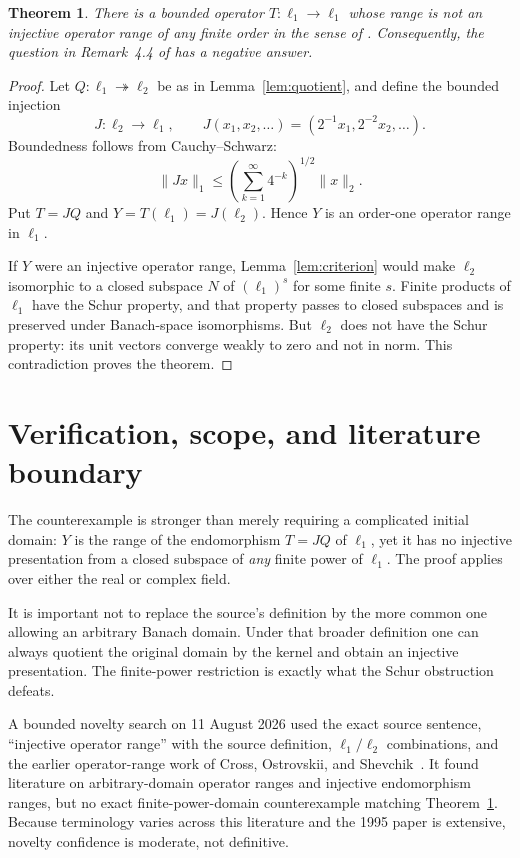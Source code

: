 \documentclass[11pt]{article}
\newtheorem{theorem}{Theorem}
\begin{document}
\begin{theorem}\label{thm:counterexample}
There is a bounded operator $T:\ell_1\to\ell_1$ whose range is not an
injective operator range of any finite order in the sense of \cite{RT}.
Consequently, the question in Remark~4.4 of \cite{RT} has a negative answer.
\end{theorem}

\begin{proof}
Let $Q:\ell_1\twoheadrightarrow\ell_2$ be as in
Lemma~\ref{lem:quotient}, and define the bounded injection
\[
 J:\ell_2\longrightarrow\ell_1,
 \qquad J(x_1,x_2,\ldots)=(2^{-1}x_1,2^{-2}x_2,\ldots).
\]
Boundedness follows from Cauchy--Schwarz:
\[
 \|Jx\|_1\leq
 \left(\sum_{k=1}^{\infty}4^{-k}\right)^{1/2}\|x\|_2.
\]
Put $T=JQ$ and $Y=T(\ell_1)=J(\ell_2)$.  Hence $Y$ is an order-one
operator range in $\ell_1$.

If $Y$ were an injective operator range, Lemma~\ref{lem:criterion} would make
$\ell_2$ isomorphic to a closed subspace $N$ of $(\ell_1)^s$ for some finite
$s$.  Finite products of $\ell_1$ have the Schur property, and that property
passes to closed subspaces and is preserved under Banach-space isomorphisms.
But $\ell_2$ does not have the Schur property: its unit vectors converge
weakly to zero and not in norm.  This contradiction proves the theorem.
\end{proof}

\section{Verification, scope, and literature boundary}

The counterexample is stronger than merely requiring a complicated initial
domain: $Y$ is the range of the endomorphism $T=JQ$ of $\ell_1$, yet it has no
injective presentation from a closed subspace of \emph{any} finite power of
$\ell_1$.  The proof applies over either the real or complex field.

It is important not to replace the source's definition by the more common
one allowing an arbitrary Banach domain.  Under that broader definition one
can always quotient the original domain by the kernel and obtain an injective
presentation.  The finite-power restriction is exactly what the Schur
obstruction defeats.

A bounded novelty search on 11 August 2026 used the exact source sentence,
``injective operator range'' with the source definition, $\ell_1/\ell_2$
combinations, and the earlier operator-range work of Cross, Ostrovskii, and
Shevchik~\cite{COS}.  It found literature on arbitrary-domain operator ranges
and injective endomorphism ranges, but no exact finite-power-domain
counterexample matching Theorem~\ref{thm:counterexample}.  Because terminology
varies across this literature and the 1995 paper is extensive, novelty
confidence is moderate, not definitive.
\end{document}
